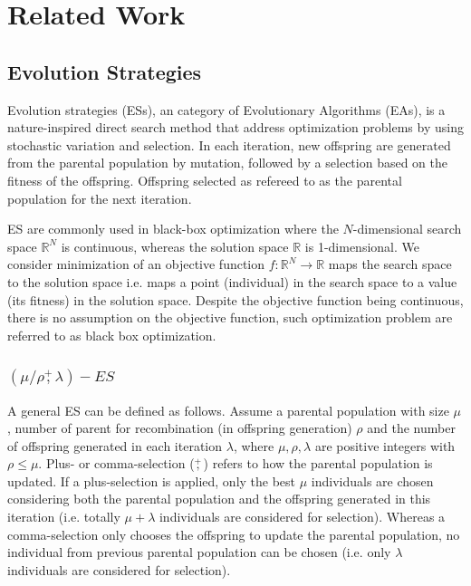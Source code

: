 \section{Related Work}
\subsection{Evolution Strategies}

Evolution strategies (ESs), an category of Evolutionary Algorithms (EAs), is a nature-inspired direct search method that address optimization problems by using stochastic variation and selection. In each iteration, new offspring are generated from the parental population by mutation, followed by a selection based on the fitness of the offspring. Offspring selected as refereed to as the parental population for the next iteration. 

ES are commonly used in black-box optimization where the $N$-dimensional search space $\mathbb{R}^N$ is continuous, whereas the solution space $\mathbb{R}$ is 1-dimensional. We consider minimization of an objective function $f:\mathbb{R}^N \rightarrow \mathbb{R}$ maps the search space to the solution space i.e. maps a point (individual) in the search space to a value (its fitness) in the solution space. Despite the objective function being continuous, there is no assumption on the objective function, such optimization problem are referred to as black box optimization. 

\subsubsection{$(\mu/\rho\overset{+}{,}\lambda)-ES$}\label{sssec:def_ES}\hfill

A general ES can be defined as follows. Assume a parental population with size $\mu$, number of parent for recombination (in offspring generation) $\rho$ and the number of offspring generated in each iteration $\lambda$, where $\mu,\rho,\lambda$ are positive integers with $\rho \leq \mu$. Plus- or comma-selection ($\overset{+}{,}$) refers to how the parental population is updated. If a plus-selection is applied, only the best $\mu$ individuals are chosen considering both the parental population and the offspring generated in this iteration (i.e. totally $\mu+\lambda$ individuals are considered for selection). Whereas a comma-selection only chooses the offspring to update the parental population, no individual from previous parental population can be chosen (i.e. only $\lambda$ individuals are considered for selection).    

